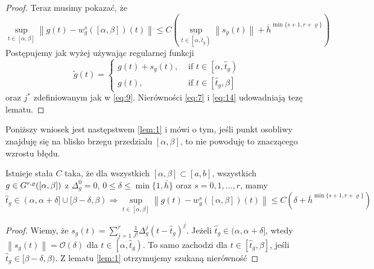 \documentclass[oik, pdftex, robocza, man]{mgrwms}
\begin{document}
\begin{proof}
        Teraz musimy pokazać, że
        \begin{equation} \label{eq:14}
            \sup _{t \in[\alpha, \beta]}\left\|g(t)-w_{g}^{s}([\alpha, \beta])(t)\right\| \leq C\left(\sup _{t \in\left[\alpha, \hat{t}_{g}\right)}\left\|s_{g}(t)\right\|+\bar{h}^{\min \{s+1, r+\varrho\}}\right)
        \end{equation}
        Postępujemy jak wyżej używając regularnej funkcji
        \begin{equation} \label{eq:15}
            \tilde{g}(t)= \begin{cases}g(t)+s_{g}(t), & \text { if } t \in\left[\alpha, \hat{t}_{g}\right) \\ g(t), & \text { if } t \in\left[\hat{t}_{g}, \beta\right]\end{cases}
        \end{equation}
        oraz $j^{*}$ zdefiniowanym jak w \eqref{eq:9}.
        Nierówności \eqref{eq:7} i \eqref{eq:14} udowadniają tezę lematu.
    \end{proof}

    Poniższy wniosek jest następstwem \eqref{lem:1} i mówi o tym, jeśli punkt osobliwy znajduję się na blisko brzegu przedzialu $[\alpha, \beta]$, to nie powoduję to znaczącego wzrostu błędu.

    \begin{cor}
        Istnieje stała $C$ taka, że dla wszystkich $[\alpha, \beta] \subset [a, b]$, wszystkich $g \in G^{r,\varrho}([\alpha,\beta])$ z $\Delta_{g}^{0} = 0$, $0 \leq \delta \leq \min \{1, \bar{h}\}$ oraz $s=0,1,\dots,r$, mamy
        \begin{equation*}
            \hat{t}_{g} \in(\alpha, \alpha+\delta] \cup[\beta-\delta, \beta) \Longrightarrow  \sup_{t \in[\alpha, \beta]}\left\|g(t)-w_{g}^{s}([\alpha, \beta])(t)\right\| \leq C\left(\delta+\bar{h}^{\min \{s+1, r+\varrho\}}\right)
        \end{equation*}
    \end{cor}
    \begin{proof}
        Wiemy, że $s_{g}(t)=\sum_{j=1}^{r} \frac{1}{j !} \Delta_{g}^{j}\left(t-\hat{t}_{g}\right)^{j}$. Jeżeli $\hat{t}_{g} \in(\alpha, \alpha+\delta]$, wtedy $\left\|s_{g}(t)\right\|=\mathcal{O}(\delta)$ dla $t \in\left[\alpha, \hat{t}_{g}\right) .$ To samo zachodzi dla $t \in\left[\hat{t}_{g}, \beta\right]$, jeśli $\hat{t}_{g} \in[\beta-\delta, \beta)$. Z lematu \eqref{lem:1} otrzymujemy szukaną nierówność
    \end{proof}
\end{document}
